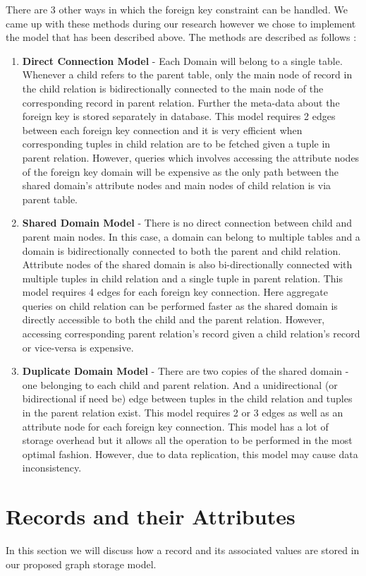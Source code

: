 \documentclass[12pt, oneside]{book}
\begin{document}
There are 3 other ways in which the foreign key constraint can be handled. We came up with these methods during our research however we chose to implement the model that has been described above. The methods are described as follows :
\begin{enumerate}
 \item \textbf{Direct Connection Model} - Each Domain will belong to a single table. Whenever a child refers to the parent table, only the main node of record in the child relation is bidirectionally connected to the main node of the corresponding record in parent relation. Further the meta-data about the foreign key is stored separately in database. This model requires 2 edges between each foreign key connection and it is very efficient when corresponding tuples in child relation are to be fetched given a tuple in parent relation. However, queries which involves accessing the attribute nodes of the foreign key domain will be expensive as the only path between the shared domain's attribute nodes and main nodes of child relation is via parent table.
 \item \textbf{Shared Domain Model} - There is no direct connection between child and parent main nodes. In this case, a domain can belong to multiple tables and a domain is bidirectionally connected to both the parent and child relation. Attribute nodes of the shared domain is also bi-directionally connected with multiple tuples in child relation and a single tuple in parent relation. This model requires 4 edges for each foreign key connection. Here aggregate queries on child relation can be performed faster as the shared domain is directly accessible to both the child and the parent relation. However, accessing corresponding parent relation's record given a child relation's record or vice-versa is expensive.
 \item \textbf{Duplicate Domain Model} - There are two copies of the shared domain - one belonging to each child and parent relation. And a unidirectional (or bidirectional if need be) edge between tuples in the child relation and tuples in the parent relation exist. This model requires 2 or 3 edges as well as an attribute node for each foreign key connection. This model has a lot of storage overhead but it allows all the operation to be performed in the most optimal fashion. However, due to data replication, this model may cause data inconsistency.
\end{enumerate}

\section{Records and their Attributes}
In this section we will discuss how a record and its associated values are stored in our proposed graph storage model.
\end{document}
